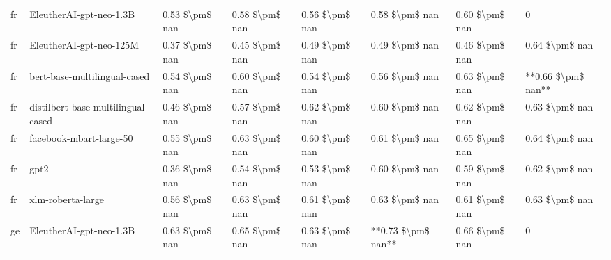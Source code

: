 \begin{tabular}{llllllll}
      fr &            EleutherAI-gpt-neo-1.3B & 0.53 \$\textbackslash pm\$ nan &            0.58 \$\textbackslash pm\$ nan &        0.56 \$\textbackslash pm\$ nan &         0.58 \$\textbackslash pm\$ nan &                          0.60 \$\textbackslash pm\$ nan &                  0 \\
      fr &            EleutherAI-gpt-neo-125M & 0.37 \$\textbackslash pm\$ nan &            0.45 \$\textbackslash pm\$ nan &        0.49 \$\textbackslash pm\$ nan &         0.49 \$\textbackslash pm\$ nan &                          0.46 \$\textbackslash pm\$ nan &     0.64 \$\textbackslash pm\$ nan \\
      fr &       bert-base-multilingual-cased & 0.54 \$\textbackslash pm\$ nan &            0.60 \$\textbackslash pm\$ nan &        0.54 \$\textbackslash pm\$ nan &         0.56 \$\textbackslash pm\$ nan &                          0.63 \$\textbackslash pm\$ nan & **0.66 \$\textbackslash pm\$ nan** \\
      fr & distilbert-base-multilingual-cased & 0.46 \$\textbackslash pm\$ nan &            0.57 \$\textbackslash pm\$ nan &        0.62 \$\textbackslash pm\$ nan &         0.60 \$\textbackslash pm\$ nan &                          0.62 \$\textbackslash pm\$ nan &     0.63 \$\textbackslash pm\$ nan \\
      fr &            facebook-mbart-large-50 & 0.55 \$\textbackslash pm\$ nan &            0.63 \$\textbackslash pm\$ nan &        0.60 \$\textbackslash pm\$ nan &         0.61 \$\textbackslash pm\$ nan &                          0.65 \$\textbackslash pm\$ nan &     0.64 \$\textbackslash pm\$ nan \\
      fr &                               gpt2 & 0.36 \$\textbackslash pm\$ nan &            0.54 \$\textbackslash pm\$ nan &        0.53 \$\textbackslash pm\$ nan &         0.60 \$\textbackslash pm\$ nan &                          0.59 \$\textbackslash pm\$ nan &     0.62 \$\textbackslash pm\$ nan \\
      fr &                  xlm-roberta-large & 0.56 \$\textbackslash pm\$ nan &            0.63 \$\textbackslash pm\$ nan &        0.61 \$\textbackslash pm\$ nan &         0.63 \$\textbackslash pm\$ nan &                          0.61 \$\textbackslash pm\$ nan &     0.63 \$\textbackslash pm\$ nan \\
      ge &            EleutherAI-gpt-neo-1.3B & 0.63 \$\textbackslash pm\$ nan &            0.65 \$\textbackslash pm\$ nan &        0.63 \$\textbackslash pm\$ nan &     **0.73 \$\textbackslash pm\$ nan** &                          0.66 \$\textbackslash pm\$ nan &                  0 \\

\end{tabular}
